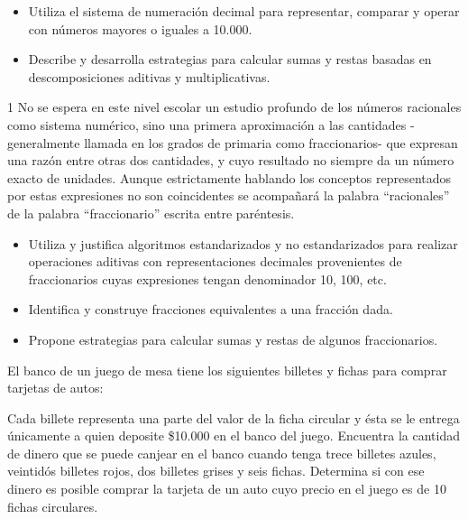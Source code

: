 
\evidencias

\begin{itemize}
  \item Utiliza el sistema de numeración decimal para representar, comparar y operar con números mayores o iguales a 10.000.
  \item Describe y desarrolla estrategias para calcular sumas y restas basadas en descomposiciones aditivas y multiplicativas.
\end{itemize}
1 No se espera en este nivel escolar un estudio profundo de los números racionales como sistema numérico, sino una primera aproximación a las cantidades -generalmente llamada en los grados de primaria como fraccionarios- que expresan una razón entre otras dos cantidades, y cuyo resultado no siempre da un número exacto de unidades. Aunque estrictamente hablando los conceptos representados por estas expresiones no son coincidentes se acompañará la palabra “racionales” de la palabra “fraccionario” escrita entre paréntesis.

\begin{itemize}
  \item Utiliza y justifica algoritmos estandarizados y no estandarizados para realizar operaciones aditivas con representaciones decimales provenientes de fraccionarios cuyas expresiones tengan denominador 10, 100, etc.
  \item Identifica y construye fracciones equivalentes a una fracción dada.
  \item Propone estrategias para calcular sumas y restas de algunos fraccionarios.
\end{itemize}

\ejemplo

El banco de un juego de mesa tiene los siguientes billetes y fichas para comprar tarjetas de autos:


Cada billete representa una parte del valor de la ficha circular y ésta se le entrega únicamente a quien deposite \$10.000 en el banco del juego. Encuentra la cantidad de dinero que se puede canjear en el banco cuando tenga trece billetes azules, veintidós billetes rojos, dos billetes grises y seis fichas. Determina si con ese dinero es posible comprar la tarjeta de un auto cuyo precio en el juego es de 10 fichas circulares.


